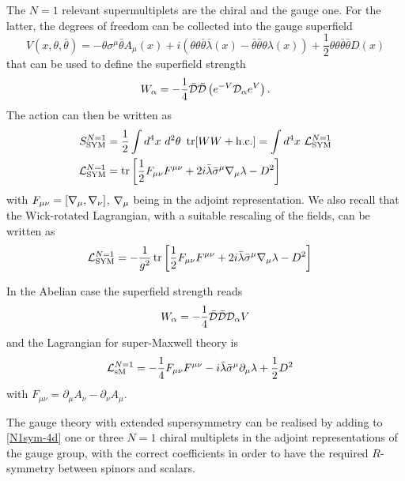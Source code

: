 The $N=1$ relevant supermultiplets are the chiral and the gauge one. For the latter, the degrees of freedom can be collected into the gauge superfield
\begin{equation}\label{wz-V}
V(x,\theta,\bar\theta) = - \theta \sigma^\mu \bar \theta A_\mu(x) + i (\theta\theta\bar \theta\bar\lambda(x) - \bar \theta\bar \theta\theta\lambda(x))
+ \frac{1}{2} \theta \theta \bar \theta \bar \theta D(x)
\end{equation}
that can be used to define the superfield strength
\begin{equation}
W_\alpha = - \frac{1}{4} \bar {{ \mathcal{D} }} \bar {{ \mathcal{D} }} \left( e^{-V} { \mathcal{D} }_\alpha e^V \right).
\end{equation}
The action can then be written as
\begin{align}\label{N1sym-4d}
S^{N=1}_{{ \text{SYM} }}
& = \frac{1}{2}
\int d^4x\  d^2\theta\ \operatorname{tr} [ W W + \text{h.c.}]
=
\int d^4x\ 
{ \mathcal{L} }^{N=1}_{ \text{SYM} }
\\
{ \mathcal{L} }^{N=1}_{ \text{SYM} }
&=
\operatorname{tr}
\left[
\frac{1}{2} F_{\mu\nu} F^{\mu\nu} + 2 i \bar \lambda \bar \sigma^\mu { \mathcal{\nabla} }_\mu  \lambda -  D^2
\right]
\end{align}
with $F_{\mu\nu} = [{ \mathcal{\nabla} }_\mu, { \mathcal{\nabla} }_\nu]$, ${ \mathcal{\nabla} }_\mu $ being in the adjoint representation.
We also recall that the Wick-rotated Lagrangian, with a suitable rescaling of the fields, can be written as
\begin{align}
\label{lagr-N1sym-4d}
{ \mathcal{L} }^{N=1}_{ \text{SYM} }
&=
-
\frac{1}{g^2}
\operatorname{tr}
\left[
\frac{1}{2} F_{\mu\nu} F^{\mu\nu} + 2 i \bar \lambda \bar \sigma^\mu { \mathcal{\nabla} }_\mu  \lambda -  D^2
\right]
\end{align}



In the Abelian case the superfield strength reads
\begin{equation}
W_\alpha = - \frac{1}{4} \bar {{ \mathcal{D} }} \bar {{ \mathcal{D} }} { \mathcal{D} }_\alpha V 
\end{equation}
and the Lagrangian for super-Maxwell theory is
\begin{align}
\label{lagr-n=1-smaxwell}
 { \mathcal{L} }^{N=1}_{\text{sM}} &=
-\frac{1}{4} F_{\mu\nu} F^{\mu\nu} - i \bar \lambda \bar \sigma^\mu \partial_\mu  \lambda + \frac{1}{2} D^2
\end{align}
with $F_{\mu\nu} = \partial_\mu A_\nu - \partial_\nu A_\mu.$

The gauge theory with extended supersymmetry can be realised by adding to \eqref{N1sym-4d} one or three $N=1$  chiral multiplets in the adjoint representations of the gauge group, with the correct coefficients in order to have the required $R$-symmetry between spinors and scalars.



